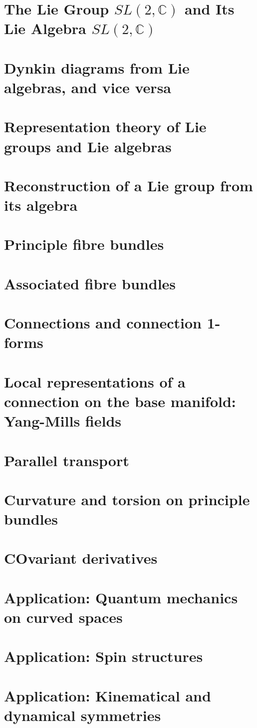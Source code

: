 \documentclass{article}
\begin{document}
\section{The Lie Group $SL(2,\mathbb{C})$ and Its Lie Algebra $SL(2,\mathbb{C})$}
\section{Dynkin diagrams from Lie algebras, and vice versa}
\section{Representation theory of Lie groups and Lie algebras}
\section{Reconstruction of a Lie group from its algebra}
\section{Principle fibre bundles}
\section{Associated fibre bundles}
\section{Connections and connection 1-forms}
\section{Local representations of a connection on the base manifold: Yang-Mills fields}
\section{Parallel transport}
\section{Curvature and torsion on principle bundles}
\section{COvariant derivatives}
\section{Application: Quantum mechanics on curved spaces}
\section{Application: Spin structures}
\section{Application: Kinematical and dynamical symmetries}
\end{document}
